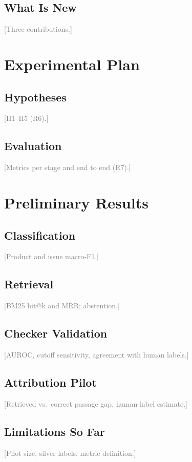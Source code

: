 \documentclass[10pt]{article}
\newcommand{\todo}[1]{\textcolor{gray}{[#1]}}
\begin{document}
\subsection{What Is New}
\todo{Three contributions.}

\section{Experimental Plan}

\subsection{Hypotheses}
\todo{H1--H5 (R6).}

\subsection{Evaluation}
\todo{Metrics per stage and end to end (R7).}

\section{Preliminary Results}\label{sec:results}

\subsection{Classification}
\todo{Product and issue macro-F1.}

\subsection{Retrieval}
\todo{BM25 hit@k and MRR; abstention.}

\subsection{Checker Validation}
\todo{AUROC, cutoff sensitivity, agreement with human labels.}

\subsection{Attribution Pilot}
\todo{Retrieved vs.\ correct passage gap, human-label estimate.}

\subsection{Limitations So Far}
\todo{Pilot size, silver labels, metric definition.}
\end{document}
